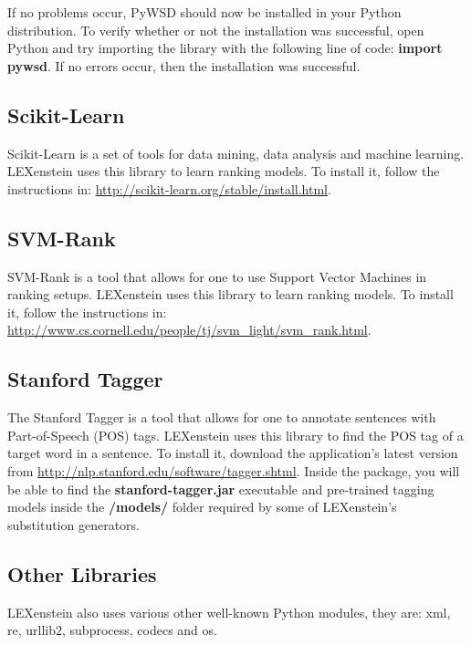 If no problems occur, PyWSD should now be installed in your Python distribution. To verify whether or not the installation was successful, open Python and try importing the library with the following line of code: \textbf{import pywsd}. If no errors occur, then the installation was successful.






\subsection{Scikit-Learn}

Scikit-Learn \cite{scikit-learn} is a set of tools for data mining, data analysis and machine learning. LEXenstein uses this library to learn ranking models. To install it, follow the instructions in: \url{http://scikit-learn.org/stable/install.html}.



\subsection{SVM-Rank}

SVM-Rank \cite{svmrank} is a tool that allows for one to use Support Vector Machines in ranking setups. LEXenstein uses this library to learn ranking models. To install it, follow the instructions in: \url{http://www.cs.cornell.edu/people/tj/svm_light/svm_rank.html}.


\subsection{Stanford Tagger}

The Stanford Tagger \cite{stanfordparser} is a tool that allows for one to annotate sentences with Part-of-Speech (POS) tags. LEXenstein uses this library to find the POS tag of a target word in a sentence. To install it, download the application's latest version from \url{http://nlp.stanford.edu/software/tagger.shtml}. Inside the package, you will be able to find the \textbf{stanford-tagger.jar} executable and pre-trained tagging models inside the \textbf{/models/} folder required by some of LEXenstein's substitution generators.



\subsection{Other Libraries}

LEXenstein also uses various other well-known Python modules, they are: xml, re, urllib$2$, subprocess, codecs and os.